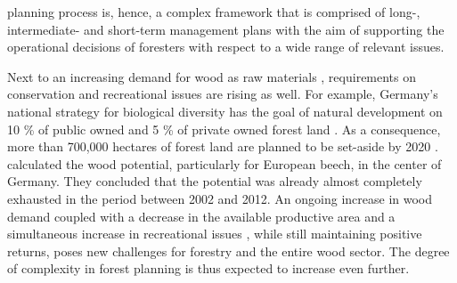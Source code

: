 planning process is, hence, a complex framework that is comprised of long-, intermediate- and short-term management plans with the aim of supporting the operational decisions of foresters with respect to a wide range of relevant issues.

Next to an increasing demand for wood as raw materials \citep[p. 8]{mantau_2012}, requirements on conservation and recreational issues are rising as well. For example, Germany's national strategy for biological diversity has the goal of natural development on 10 \% of public owned and 5 \% of private owned forest land \citep[p. 45]{bmu_2007}. As a consequence, more than 700,000 hectares of forest land are planned to be set-aside by 2020 \citep{ti_2014}. \citet[p. 3]{auer_2016} calculated the wood potential, particularly for European beech, in the center of Germany. They concluded that the potential was already almost completely exhausted in the period between 2002 and 2012. An ongoing increase in wood demand coupled with a decrease in the available productive area and a simultaneous increase in recreational issues \citep[p. 1]{hansen_2012}, while still maintaining positive returns, poses new challenges for forestry and the entire wood sector. The degree of complexity in forest planning is thus expected to increase even further.

